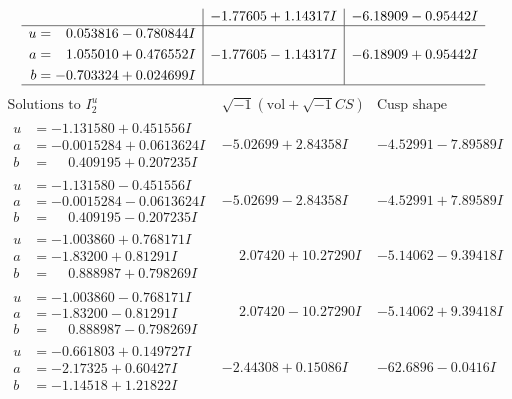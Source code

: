\documentclass[1p]{elsarticle_modified}
\theoremstyle{definition}
\newcommand{\I}{\sqrt{-1}}
\begin{document}
$$\begin{array}{c|c|c}
 & -1.77605 + 1.14317 I & -6.18909 - 0.95442 I \\ \hline\begin{aligned}
u &= \phantom{-}0.053816 - 0.780844 I \\
a &= \phantom{-}1.055010 + 0.476552 I \\
b &= -0.703324 + 0.024699 I\end{aligned}
 & -1.77605 - 1.14317 I & -6.18909 + 0.95442 I\\
 \hline 
 \end{array}$$\newpage$$\begin{array}{c|c|c}  
\text{Solutions to }I^u_{2}& \I (\text{vol} + \sqrt{-1}CS) & \text{Cusp shape}\\
 \hline 
\begin{aligned}
u &= -1.131580 + 0.451556 I \\
a &= -0.0015284 + 0.0613624 I \\
b &= \phantom{-}0.409195 + 0.207235 I\end{aligned}
 & -5.02699 + 2.84358 I & -4.52991 - 7.89589 I \\ \hline\begin{aligned}
u &= -1.131580 - 0.451556 I \\
a &= -0.0015284 - 0.0613624 I \\
b &= \phantom{-}0.409195 - 0.207235 I\end{aligned}
 & -5.02699 - 2.84358 I & -4.52991 + 7.89589 I \\ \hline\begin{aligned}
u &= -1.003860 + 0.768171 I \\
a &= -1.83200 + 0.81291 I \\
b &= \phantom{-}0.888987 + 0.798269 I\end{aligned}
 & \phantom{-}2.07420 + 10.27290 I & -5.14062 - 9.39418 I \\ \hline\begin{aligned}
u &= -1.003860 - 0.768171 I \\
a &= -1.83200 - 0.81291 I \\
b &= \phantom{-}0.888987 - 0.798269 I\end{aligned}
 & \phantom{-}2.07420 - 10.27290 I & -5.14062 + 9.39418 I \\ \hline\begin{aligned}
u &= -0.661803 + 0.149727 I \\
a &= -2.17325 + 0.60427 I \\
b &= -1.14518 + 1.21822 I\end{aligned}
 & -2.44308 + 0.15086 I & -62.6896 - 0.0416 I \\ \hline\begin{aligned}

\end{aligned}
\end{array}$$
\end{document}
